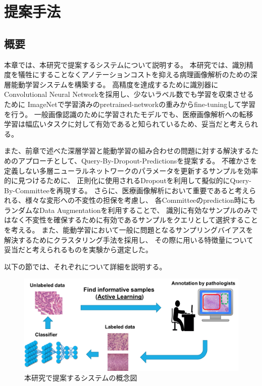 \chapter{提案手法}

\section{概要}
本章では、本研究で提案するシステムについて説明する。
本研究では、識別精度を犠牲にすることなくアノテーションコストを抑える病理画像解析のための深層能動学習システムを構築する。
高精度を達成するために識別器にConvolutional Neural Networkを採用し、少ないラベル数でも学習を収束させるために
ImageNetで学習済みのpretrained-networkの重みからfine-tuningして学習を行う。
一般画像認識のために学習されたモデルでも、医療画像解析への転移学習は幅広いタスクに対して有効であると知られているため、妥当だと考えられる。

また、前章で述べた深層学習と能動学習の組み合わせの問題に対する解決するためのアプローチとして、Query-By-Dropout-Predictionsを提案する。
不確かさを定義しない多層ニューラルネットワークのパラメータを更新するサンプルを効率的に見つけるために、
正則化に使用されるDropoutを利用して擬似的にQuery-By-Committeeを再現する。
さらに、医療画像解析において重要であると考えられる、様々な変形への不変性の担保を考慮し、
各Committeeのprediction時にもランダムなData Augmentationを利用することで、
識別に有効なサンプルのみではなく不変性を確保するために有効であるサンプルをクエリとして選択することを考える。
また、能動学習において一般に問題となるサンプリングバイアスを解決するためにクラスタリング手法を採用し、
その際に用いる特徴量について妥当だと考えられるものを実験から選定した。

以下の節では、それぞれについて詳細を説明する。

\clearpage

\begin{figure}[tbp]
    \label{fig:overview}
     \begin{center}
      \includegraphics[width=120mm]{figures/overview.png}
     \end{center}
    \caption{本研究で提案するシステムの概念図}
\end{figure}

